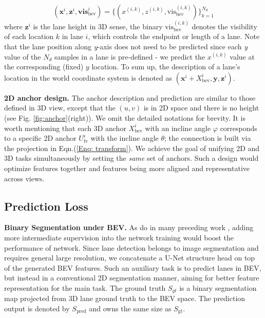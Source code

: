 \documentclass[runningheads]{llncs}
\begin{document}
\begin{equation}
    (\mathbf{x}^i, \mathbf{z}^i, \mathbf{vis}^i_{\text{bev}}) = \{ (x^{(i,k)}, z^{(i,k)}, \text{vis}^{(i,k)}_{\text{bev}} ) \}^{N_d}_{k=1}
\end{equation}
where $\textbf{z}^i$ is the lane height in 3D sense,  the binary $\text{vis}^{(i,k)}_{\text{bev}}$ denotes the visibility of each location $k$  in  lane $i$, which controls the endpoint or length of a lane. 
Note that the lane position along \textit{y}-axis does not need to be predicted since each \textit{y} value of the $N_d$ samples in a lane is pre-defined - we predict the $x^{(i,k)}$ value at the corresponding (fixed) $y$ location. 
To sum up, the description of a lane's location in the world coordinate system is denoted as
 $(\textbf{x}^i + X^i_{\text{bev}}, \textbf{y}, \textbf{z}^i)$.








\textbf{2D anchor design.} The anchor description and prediction are similar to those defined in 3D view, 
except that the $(u, v)$ is in 2D space and there is no height (see Fig. \ref{fig:anchor}({right})).
We omit the detailed notations for brevity.
It is worth mentioning that each 3D anchor $X^i_{\text{bev}}$ with an incline angle $\varphi$ corresponds to a specific 2D anchor $U^i_{\text{fv}}$ with the incline angle $\theta$; the connection is built via the projection in Eqn.(\ref{Enq: transform}).
We achieve the goal of unifying 2D and 3D tasks simultaneously by setting the \textit{same} set of anchors. Such a design would optimize features together and features being more aligned and representative across views.






\subsection{Prediction Loss}\label{sec: alg - loss}

\textbf{Binary Segmentation under BEV.} 
As do in many preceding work \cite{wei2016convolutional,newell2016stacked,huang2019apolloscape}, adding more intermediate supervision into the network training would
{boost the performance of network}.
Since lane detection belongs to image segmentation and requires general large resolution, 
we concatenate a U-Net structure \cite{ronneberger2015u} head on top of the generated BEV features. 
Such an auxiliary task is to predict lanes in BEV, but instead in a conventional 2D segmentation manner, aiming for better feature representation for the main task.
The ground truth $S_{gt}$ 
is a binary segmentation map projected from 3D lane ground truth to the BEV space.
The prediction output is denoted by $S_{ \text{pred}}$ and owns the same size as $S_{ \text{gt} }$.
\end{document}
